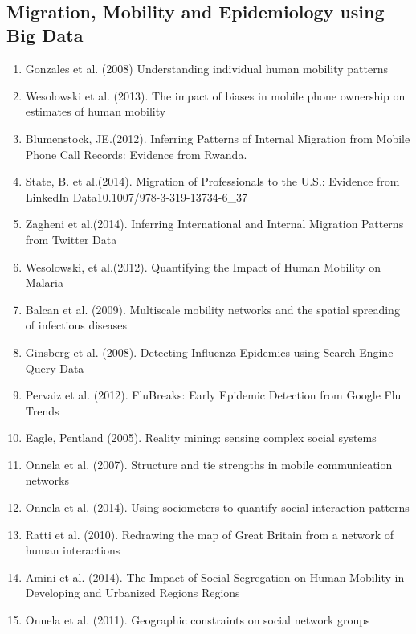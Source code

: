 \\  \subsection{Migration, Mobility and Epidemiology using Big Data}  \begin{enumerate} 
\item Gonzales et al. (2008)  Understanding individual human mobility patterns\cite{Gonz_lez_2008} 
\item Wesolowski et al. (2013).  The impact of biases in mobile phone ownership on estimates of human mobility\cite{Wesolowski_2013}  
\item  Blumenstock, JE.(2012).  Inferring Patterns of Internal Migration from Mobile Phone Call Records: Evidence from Rwanda\cite{Blumenstock_2012}.   
\item  State, B. et al.(2014).  Migration of Professionals to the U.S.: Evidence from LinkedIn Data10.1007/978-3-319-13734-6_37\cite{State_2014}  
\item  Zagheni et al.(2014).  Inferring International and Internal Migration Patterns from Twitter Data\cite{Zagheni:2014:III:2567948.2576930}  
\item  Wesolowski, et al.(2012).  Quantifying the Impact of Human Mobility on Malaria \cite{Wesolowski_2012} 
\item Balcan et al. (2009).  Multiscale mobility networks and the spatial spreading of infectious diseases\cite{Balcan_2009}  
\item Ginsberg et al. (2008).  Detecting Influenza Epidemics using Search Engine Query Data\cite{Ginsberg_2008} 
\item Pervaiz et al. (2012).  FluBreaks: Early Epidemic Detection from Google Flu Trends\cite{Pervaiz_2012}   
\item Eagle, Pentland (2005).  Reality mining: sensing complex social systems\cite{Eagle_2005} 
\item Onnela et al. (2007).  Structure and tie strengths in mobile communication networks\cite{Onnela_2007}   
\item Onnela et al. (2014).  Using sociometers to quantify social interaction patterns\cite{Onnela_2014}   
\item Ratti et al. (2010).  Redrawing the map of Great Britain from a network of human interactions\cite{Ratti_2010} 
\item Amini et al. (2014).  The Impact of Social Segregation on Human Mobility in Developing and Urbanized Regions\cite{Amini_2014} Regions  
\item Onnela et al. (2011).  Geographic constraints on social network groups\cite{Onnela_2011} 


\end{enumerate}
